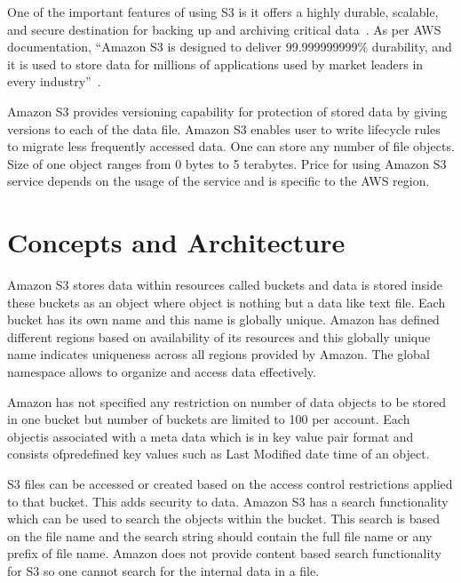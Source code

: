 One of the important features of using S3 is it offers a highly
durable, scalable, and secure destination for backing up and archiving
critical data~\cite{hid-sp18-420-amazon-S3}. As per AWS documentation,
``Amazon S3 is designed to deliver 99.999999999\% durability, and it
is used to store data for millions of applications used by market
leaders in every industry''~\cite{hid-sp18-420-amazon-S3}.

Amazon S3 provides versioning capability for protection of stored data
by giving versions to each of the data file. Amazon S3 enables user to
write lifecycle rules to migrate less frequently accessed data. One
can store any number of file objects. Size of one object ranges from 0
bytes to 5 terabytes. Price for using Amazon S3 service depends on the
usage of the service and is specific to the AWS region.



\section{Concepts and Architecture}


Amazon S3 stores data within resources called buckets and data is
stored inside these buckets as an object where object is nothing but a
data like text file.  Each bucket has its own name and this name is
globally unique. Amazon has defined different regions based on
availability of its resources and this globally unique name indicates
uniqueness across all regions provided by Amazon. The global namespace
allows to organize and access data effectively.

Amazon has not specified any restriction on number of data objects to
be stored in one bucket but number of buckets are limited to 100 per
account.  Each objectis associated with a meta data which is in key
value pair format and consists ofpredefined key values such as Last
Modified date time of an object.

S3 files can be accessed or created based on the access control
restrictions applied to that bucket. This adds security to
data. Amazon S3 has a search functionality which can be used to search
the objects within the bucket. This search is based on the file name
and the search string should contain the full file name or any prefix
of file name. Amazon does not provide content based search
functionality for S3 so one cannot search for the internal data in a
file.





